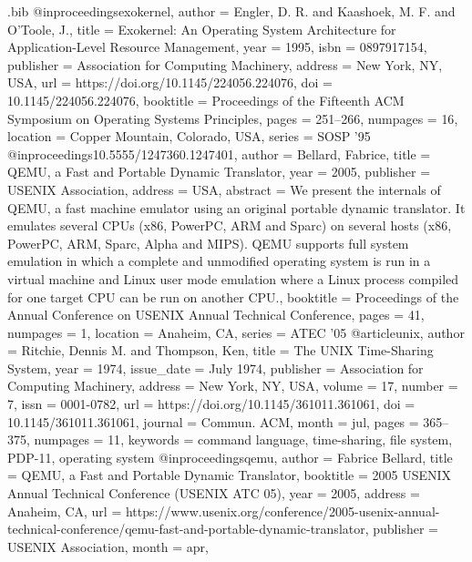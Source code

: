 \documentclass[letterpaper,twocolumn,10pt]{article}
\begin{document}
\begin{filecontents}{\jobname.bib}
@inproceedings{exokernel,
  author = {Engler, D. R. and Kaashoek, M. F. and O'Toole, J.},
  title = {Exokernel: An Operating System Architecture for Application-Level Resource Management},
  year = {1995},
  isbn = {0897917154},
  publisher = {Association for Computing Machinery},
  address = {New York, NY, USA},
  url = {https://doi.org/10.1145/224056.224076},
  doi = {10.1145/224056.224076},
  booktitle = {Proceedings of the Fifteenth ACM Symposium on Operating Systems Principles},
  pages = {251–266},
  numpages = {16},
  location = {Copper Mountain, Colorado, USA},
  series = {SOSP '95}
}
@inproceedings{10.5555/1247360.1247401,
  author = {Bellard, Fabrice},
  title = {QEMU, a Fast and Portable Dynamic Translator},
  year = {2005},
  publisher = {USENIX Association},
  address = {USA},
  abstract = {We present the internals of QEMU, a fast machine emulator using an original portable dynamic translator. It emulates several CPUs (x86, PowerPC, ARM and Sparc) on several hosts (x86, PowerPC, ARM, Sparc, Alpha and MIPS). QEMU supports full system emulation in which a complete and unmodified operating system is run in a virtual machine and Linux user mode emulation where a Linux process compiled for one target CPU can be run on another CPU.},
  booktitle = {Proceedings of the Annual Conference on USENIX Annual Technical Conference},
  pages = {41},
  numpages = {1},
  location = {Anaheim, CA},
  series = {ATEC '05}
}
@article{unix,
  author = {Ritchie, Dennis M. and Thompson, Ken},
  title = {The UNIX Time-Sharing System},
  year = {1974},
  issue_date = {July 1974},
  publisher = {Association for Computing Machinery},
  address = {New York, NY, USA},
  volume = {17},
  number = {7},
  issn = {0001-0782},
  url = {https://doi.org/10.1145/361011.361061},
  doi = {10.1145/361011.361061},
  journal = {Commun. ACM},
  month = jul,
  pages = {365–375},
  numpages = {11},
  keywords = {command language, time-sharing, file system, PDP-11, operating system}
}
@inproceedings{qemu,
  author = {Fabrice Bellard},
  title = {{QEMU}, a Fast and Portable Dynamic Translator},
  booktitle = {2005 {USENIX} Annual Technical Conference ({USENIX} {ATC} 05)},
  year = {2005},
  address = {Anaheim, CA},
  url = {https://www.usenix.org/conference/2005-usenix-annual-technical-conference/qemu-fast-and-portable-dynamic-translator},
  publisher = {{USENIX} Association},
  month = apr,
}
\end{filecontents}

\end{document}
